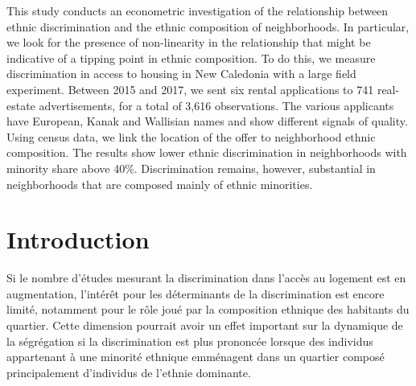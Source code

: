 \documentclass{Revue-economique} %
\begin{document}
\begin{Article}

\begin{resumeENG}
    This study conducts an econometric investigation of the relationship between ethnic discrimination and the ethnic composition of neighborhoods. In particular, we look for the presence of non-linearity in the relationship that might be indicative of a tipping point in ethnic composition. To do this, we measure discrimination in access to housing in New Caledonia with a large field experiment. Between 2015 and 2017, we sent six rental applications to 741 real-estate advertisements, for a total of 3,616 observations. The various applicants have European, Kanak and Wallisian names and show different signals of quality. Using census data, we link the location of the offer to neighborhood ethnic composition. The results show lower ethnic discrimination in neighborhoods with minority share above 40\%. Discrimination remains, however, substantial in neighborhoods that are composed mainly of ethnic minorities.    
\end{resumeENG}


\section{Introduction}

Si le nombre d’études mesurant la discrimination dans l’accès au logement est en augmentation, l’intérêt pour les déterminants de la discrimination est encore limité, notamment pour le rôle joué par la composition ethnique des habitants du quartier. Cette dimension pourrait avoir un effet important sur la dynamique de la ségrégation si la discrimination est plus prononcée lorsque des individus appartenant à une minorité ethnique emménagent dans un quartier composé principalement d’individus de l’ethnie dominante.


\end{Article}
\end{document}
